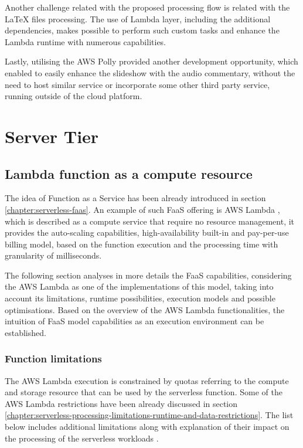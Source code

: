 Another challenge related with the proposed processing flow is related with the LaTeX files processing. The use of Lambda layer, including the additional dependencies, makes possible to perform such custom tasks and enhance the Lambda runtime with numerous capabilities.

Lastly, utilising the AWS Polly provided another development opportunity, which enabled to easily enhance the slideshow with the audio commentary, without the need to host similar service or incorporate some other third party service, running outside of the cloud platform.

\section{Server Tier}

\subsection{Lambda function as a compute resource}

The idea of Function as a Service has been already introduced in section \ref{chapter:serverless-faas}.
An example of such FaaS offering is AWS Lambda \cite{AWSLambda}, which is described as a compute service that require no resource management, it provides the auto-scaling capabilities, high-availability built-in and pay-per-use billing model, based on the function execution and the processing time with granularity of milliseconds. 

The following section analyses in more details the FaaS capabilities, considering the AWS Lambda as one of the implementations of this model, taking into account its limitations, runtime possibilities, execution models and possible optimisations.
Based on the overview of the AWS Lambda functionalities, the intuition of FaaS model capabilities as an execution environment can be established.

\subsubsection{Function limitations}

The AWS Lambda execution is constrained by quotas referring to the compute and storage resource that can be used by the serverless function.
Some of the AWS Lambda restrictions have been already discussed in section \ref{chapter:serverless-processing-limitations-runtime-and-data-restrictions}.
The list below includes additional limitations along with explanation of their impact on the processing of the serverless workloads \cite{AWSLambdaQuotas}.

